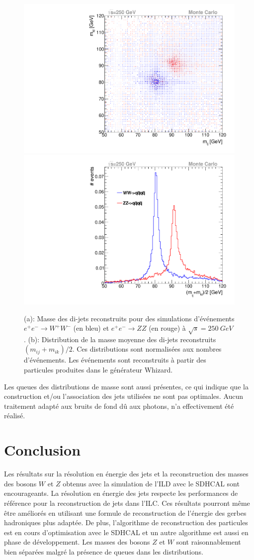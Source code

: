 \begin{figure}[!ht]
  \includegraphics[width=.49\textwidth]{ILD/figs/mIJ_vs_mKL_MC.pdf}
  \includegraphics[width=.49\textwidth]{ILD/figs/mass_distrib_MC.pdf}
  \caption{(a): Masse des di-jets reconstruits pour des simulations d'événements $e^+e^-\rightarrow W^+W^-$ (en bleu) et $e^+e^-\rightarrow ZZ$ (en rouge) à $\sqrt{s}=250~GeV$. (b): Distribution de la masse moyenne des di-jets reconstruits $(m_{ij}+m_{ik})/2$. Ces distributions sont normalisées aux nombres d'événements. Les événements sont reconstruits à partir des particules produites dans le générateur Whizard.}
  \label{fig:ww-zz-mass_MC}
\end{figure}
 Les queues des distributions de masse sont aussi présentes, ce qui indique que la construction et/ou l'association des jets utilisées ne sont pas optimales. Aucun traitement adapté aux bruits de fond dû aux photons, n'a effectivement été réalisé. 

\newpage
\section{Conclusion}
Les résultats sur la résolution en énergie des jets et la reconstruction des masses des bosons $W$ et $Z$ obtenus avec la simulation de l'ILD avec le SDHCAL sont encourageants. La résolution en énergie des jets respecte les performances de référence pour la reconstruction de jets dans l'ILC. Ces résultats pourront même être améliorés en utilisant une formule de reconstruction de l'énergie des gerbes hadroniques plus adaptée. De plus, l'algorithme de reconstruction des particules est en cours d'optimisation avec le SDHCAL et un autre algorithme est aussi en phase de développement. Les masses des bosons $Z$ et $W$ sont raisonnablement bien séparées malgré la présence de queues dans les distributions. 
